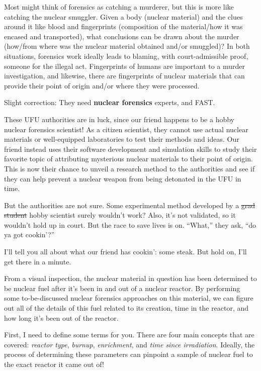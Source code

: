 {Most might think of forensics as catching a murderer, but this is more like
catching the nuclear smuggler. Given a body (nuclear material) and the clues
around it like blood and fingerprints (composition of the material\slash how it
was encased and transported), what conclusions can be drawn about the murder
(how\slash from where was the nuclear material obtained and\slash or smuggled)?
In both situations, forensics work ideally leads to blaming, with
court-admissible proof, someone for the illegal act. Fingerprints of humans are
important to a murder investigation, and likewise, there are fingerprints of
nuclear materials that can provide their point of origin and\slash or where
they were processed.

\begin{shadequote}

  Slight correction: They need \textbf{nuclear forensics} experts, and FAST. 
  
  These UFU authorities are in luck, since our friend happens to be a hobby
  nuclear forensics scientist! As a citizen scientist, they cannot use actual
  nuclear materials or well-equipped laboratories to test their methods and
  ideas. Our friend instead uses their software development and simulation
  skills to study their favorite topic of attributing mysterious nuclear
  materials to their point of origin. This is now their chance to unveil a
  research method to the authorities and see if they can help prevent a nuclear
  weapon from being detonated in the UFU in time. 
  
  But the authorities are not sure. Some experimental method developed by a
  \sout{grad student} hobby scientist surely wouldn't work? Also, it's not
  validated, so it wouldn't hold up in court. But the race to save lives is on.
  ``What,'' they ask, ``do ya got cookin'?''

\end{shadequote}

\narr I'll tell you all about what our friend has cookin': some steak. But hold
on, I'll get there in a minute.

From a visual inspection, the nuclear material in question has been determined
to be nuclear fuel after it's been in and out of a nuclear reactor. By
performing some to-be-discussed nuclear forensics approaches on this material,
we can figure out all of the details of this fuel related to its creation, time
in the reactor, and how long it's been out of the reactor. 

First, I need to define some terms for you. There are four main concepts that
are covered: \textit{reactor type}, \textit{burnup}, \textit{enrichment}, and
\textit{time since irradiation}.  Ideally, the process of determining these
parameters can pinpoint a sample of nuclear fuel to the exact reactor it came
out of!

}
